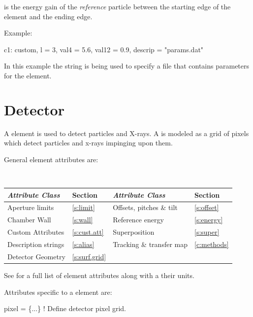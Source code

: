  is the energy gain of the {\it reference} particle
between the starting edge of the element and the ending edge.

Example:
\begin{example}
  c1: custom, l = 3, val4 = 5.6, val12 = 0.9, descrip = "params.dat"
\end{example}
In this example the  string is being used to specify a
file that contains parameters for the element.

\newpage

\section{Detector}
\label{s:detector}

A  element is used to detect particles and X-rays.  A
 is modeled as a grid of pixels which detect particles and x-rays
impinging upon them.

General  element attributes are:
\begin{center}
\tt 
\begin{tabular}{llll} \toprule
  {\sl Attribute Class}      & Section           & {\sl Attribute Class}      & Section         \\ \midrule
  Aperture limits            & \ref{s:limit}     & Offsets, pitches \& tilt   & \ref{s:offset}  \\
  Chamber Wall               & \ref{s:wall}      & Reference energy           & \ref{s:energy}  \\
  Custom Attributes          & \ref{s:cust.att}  & Superposition              & \ref{s:super}   \\
  Description strings        & \ref{s:alias}     & Tracking \& transfer map   & \ref{c:methods} \\
  Detector Geometry          & \ref{s:surf.grid} &                            &                 \\
  \bottomrule
\end{tabular}
\end{center}
\toffset
See  for a full list of element attributes along with a their units.

Attributes specific to a  element are:
\begin{example}
  pixel         = \{...\}   ! Define detector pixel grid.
\end{example}

